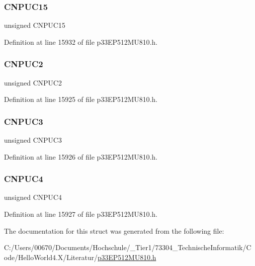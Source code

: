 \subsubsection{\texorpdfstring{C\+N\+P\+U\+C15}{CNPUC15}}
{\footnotesize\ttfamily unsigned C\+N\+P\+U\+C15}



Definition at line 15932 of file p33\+E\+P512\+M\+U810.\+h.

\mbox{\label{structtag_c_n_p_u_c_b_i_t_s_aafc6cbc6a910bda89cb2063ebe6e0d98}} 
\subsubsection{\texorpdfstring{C\+N\+P\+U\+C2}{CNPUC2}}
{\footnotesize\ttfamily unsigned C\+N\+P\+U\+C2}



Definition at line 15925 of file p33\+E\+P512\+M\+U810.\+h.

\mbox{\label{structtag_c_n_p_u_c_b_i_t_s_a40d2730a2421aa29415ea389bedea982}} 
\subsubsection{\texorpdfstring{C\+N\+P\+U\+C3}{CNPUC3}}
{\footnotesize\ttfamily unsigned C\+N\+P\+U\+C3}



Definition at line 15926 of file p33\+E\+P512\+M\+U810.\+h.

\mbox{\label{structtag_c_n_p_u_c_b_i_t_s_afd09b4aeed903dabb139d5bb30b80b6c}} 
\subsubsection{\texorpdfstring{C\+N\+P\+U\+C4}{CNPUC4}}
{\footnotesize\ttfamily unsigned C\+N\+P\+U\+C4}



Definition at line 15927 of file p33\+E\+P512\+M\+U810.\+h.



The documentation for this struct was generated from the following file\+:\begin{DoxyCompactItemize}
\item 
C\+:/\+Users/00670/\+Documents/\+Hochschule/\+\_\+\+Tier1/73304\+\_\+\+Technische\+Informatik/\+Code/\+Hello\+World4.\+X/\+Literatur/\hyperlink{p33_e_p512_m_u810_8h}{p33\+E\+P512\+M\+U810.\+h}\end{DoxyCompactItemize}
